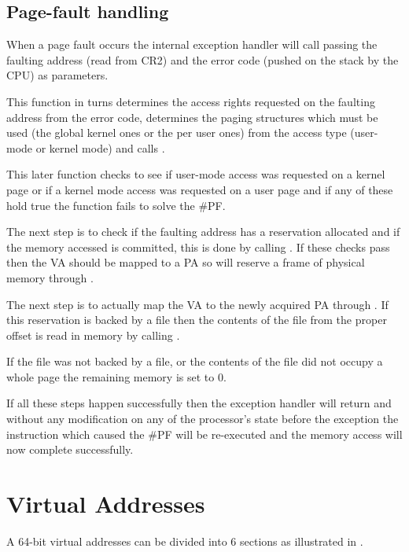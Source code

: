 \begin{appendices}
\subsection{Page-fault handling}
\label{sect:PfHandling}

When a page fault occurs the internal exception handler will call  passing
the faulting address (read from CR2) and the error code (pushed on the stack by the CPU) as
parameters.

This function in turns determines the access rights requested on the faulting address from the error
code, determines the paging structures which must be used (the global kernel ones or the per user
ones) from the access type (user-mode or kernel mode) and calls .

This later function checks to see if user-mode access was requested on a kernel page or if a kernel
mode access was requested on a user page and if any of these hold true the function fails to solve
the \#PF.

The next step is to check if the faulting address has a reservation allocated and if the memory
accessed is committed, this is done by calling . If these
checks pass then the VA should be mapped to a PA so \projectname will reserve a frame of
physical memory through .

The next step is to actually map the VA to the newly acquired PA through .
If this reservation is backed by a file then the contents of the file from the proper offset is read
in memory by calling .

If the file was not backed by a file, or the contents of the file did not occupy a whole page the
remaining memory is set to 0.

If all these steps happen successfully then the exception handler will return and without any
modification on any of the processor's state before the exception the instruction which caused the
\#PF will be re-executed and the memory access will now complete successfully.

\section{Virtual Addresses}
\label{sect:VirtAddr}

A 64-bit virtual addresses can be divided into 6 sections as illustrated in .


\end{appendices}
